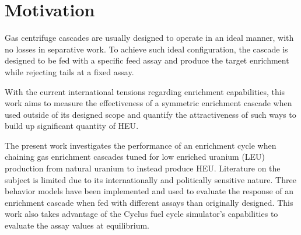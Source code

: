 \section{Motivation}

Gas centrifuge cascades are usually designed to operate in an ideal manner, with
no losses in separative work. To achieve such ideal configuration, the cascade
is designed to be fed with a specific feed assay and produce the target
enrichment while rejecting tails at a fixed assay.

With the current international tensions regarding enrichment capabilities, this
work aims to measure the effectiveness of a symmetric enrichment cascade when
used outside of its designed scope and quantify the attractiveness of such ways
to build up significant quantity of \gls{HEU}.

The present work investigates the performance of an enrichment cycle when chaining
gas enrichment cascades tuned for low enriched uranium (LEU) production from natural
uranium to instead produce HEU. Literature on the subject is limited due to its
internationally and politically sensitive nature. Three behavior models have been
implemented and used to evaluate the response of an enrichment cascade when fed
with different assays than originally designed. This work also takes advantage
of the Cyclus \cite{cyclus} fuel cycle simulator's capabilities to evaluate the
assay values at equilibrium.
